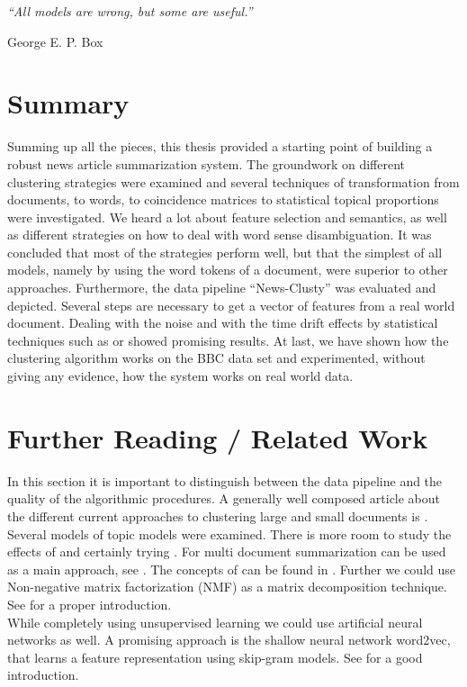 \epigraph{\emph{
  ``All models are wrong, but some are useful.''
}}{ George E. P. Box }

\section{Summary}
\label{sec:summary}
Summing up all the pieces, this thesis provided a starting point of building a robust  news article summarization system. The groundwork on different clustering strategies were examined and several techniques of transformation from documents, to words, to coincidence matrices to statistical topical proportions were investigated. We heard a lot about feature selection and semantics, as well as different strategies on how to deal with word sense disambiguation. It was concluded that most of the strategies perform well, but that the simplest of all models, namely by using the word tokens of a document, were superior to other approaches. Furthermore, the data pipeline ``News-Clusty'' was evaluated and depicted. Several steps are necessary to get a vector of features from a real world document. Dealing with the noise and with the time drift effects by statistical techniques such as \lsa{} or \lda{} showed promising results. At last, we have shown how the clustering algorithm works on the BBC data set and experimented, without giving any evidence, how the system works on real world data.

\section{Further Reading / Related Work}
\label{sec:further_reading}
In this section it is important to distinguish between the data pipeline and the quality of the algorithmic procedures. A generally well composed article about the different current approaches to clustering large and small documents is \cite{NextFrontierClustering2013}.\\

Several models of topic models were examined. There is more room to study the effects of \lda{} and certainly trying \hdp{}. For multi document summarization \lda{} can be used as a main approach, see \cite{MultiDocSumLDA2008}. The concepts of \hdpfull{} can be found in \cite{NonParametricBayes2007, HDP2006}. Further we could use Non-negative matrix factorization (NMF) as a matrix decomposition technique. See \cite{NMF1999} for a proper introduction.\\

While completely using unsupervised learning we could use artificial neural networks as well. A promising approach is the shallow neural network word2vec, that learns a feature representation using skip-gram models. See \cite{Word2Vec2014} for a good introduction.\\

